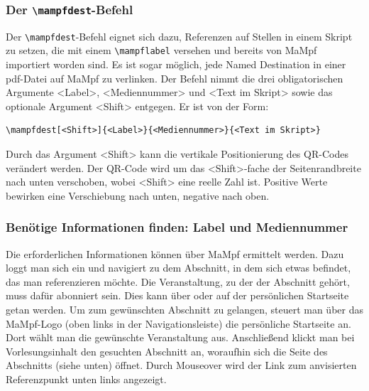 \documentclass[parskip=off,index=totocnumbered]{scrartcl}
\begin{document}
\subsubsection{Der \texttt{\textbackslash mampfdest}-Befehl} \label{subsubsec:dest}
Der \verb|\mampfdest|-Befehl eignet sich dazu, Referenzen auf Stellen in einem Skript zu setzen, die mit einem \verb|\mampflabel| versehen und bereits von MaMpf importiert worden sind. Es ist sogar möglich, jede Named Destination in einer pdf-Datei auf MaMpf zu verlinken. Der Befehl nimmt die drei obligatorischen Argumente <Label>, <Mediennummer> und <Text im Skript> sowie das optionale Argument <Shift> entgegen. Er ist von der Form:
   \begin{verbatim}
\mampfdest[<Shift>]{<Label>}{<Mediennummer>}{<Text im Skript>}
   \end{verbatim}
\vspace{-0.5cm}
Durch das Argument <Shift> kann die vertikale Positionierung des QR-Codes verändert werden. Der QR-Code wird um das <Shift>-fache der Seitenrandbreite nach unten verschoben, wobei <Shift> eine reelle Zahl ist. Positive Werte bewirken eine Verschiebung nach unten, negative nach oben.  
   
\subsubsection*{Benötige Informationen finden: Label und Mediennummer} \label{subsubsec:infos}
Die erforderlichen Informationen können über MaMpf ermittelt werden. Dazu loggt man sich ein und navigiert zu dem Abschnitt, in dem sich etwas befindet, das man referenzieren möchte. Die Veranstaltung, zu der der Abschnitt gehört, muss dafür abonniert sein. Dies kann über \userset oder auf der persönlichen Startseite getan werden. Um zum gewünschten Abschnitt zu gelangen, steuert man über das MaMpf-Logo (oben links in der Navigationsleiste) die persönliche Startseite an. Dort wählt man die gewünschte Veranstaltung aus. Anschließend klickt man bei \textsf{Vorlesungsinhalt} den gesuchten Abschnitt an, woraufhin sich die Seite des Abschnitts (siehe unten) öffnet. Durch Mouseover wird der Link zum anvisierten Referenzpunkt unten links angezeigt.
\vspace{0.4cm}  

\noindent \begin{minipage}{\textwidth}
\end{minipage}
\vspace{0.1cm}
\end{document}
